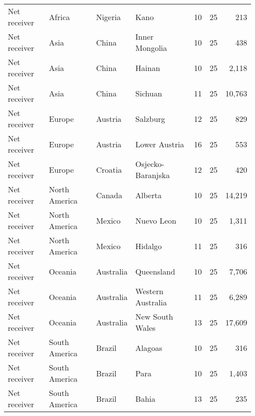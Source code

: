\begin{tabular}{llllrrr}
 Net receiver     & Africa        & Nigeria                & Kano               &             10 &          25 &          213 \\
 Net receiver     & Asia          & China                  & Inner Mongolia     &             10 &          25 &          438 \\
 Net receiver     & Asia          & China                  & Hainan             &             10 &          25 &        2,118 \\
 Net receiver     & Asia          & China                  & Sichuan            &             11 &          25 &       10,763 \\
 Net receiver     & Europe        & Austria                & Salzburg           &             12 &          25 &          829 \\
 Net receiver     & Europe        & Austria                & Lower Austria      &             16 &          25 &          553 \\
 Net receiver     & Europe        & Croatia                & Osjecko-Baranjska  &             12 &          25 &          420 \\
 Net receiver     & North America & Canada                 & Alberta            &             10 &          25 &       14,219 \\
 Net receiver     & North America & Mexico                 & Nuevo Leon         &             10 &          25 &        1,311 \\
 Net receiver     & North America & Mexico                 & Hidalgo            &             11 &          25 &          316 \\
 Net receiver     & Oceania       & Australia              & Queensland         &             10 &          25 &        7,706 \\
 Net receiver     & Oceania       & Australia              & Western Australia  &             11 &          25 &        6,289 \\
 Net receiver     & Oceania       & Australia              & New South Wales    &             13 &          25 &       17,609 \\
 Net receiver     & South America & Brazil                 & Alagoas            &             10 &          25 &          316 \\
 Net receiver     & South America & Brazil                 & Para               &             10 &          25 &        1,403 \\
 Net receiver     & South America & Brazil                 & Bahia              &             13 &          25 &          235 \\

\end{tabular}
